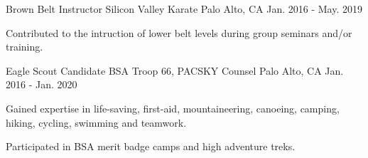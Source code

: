 

\begin{cventries}

  \cventry
    {Brown Belt Instructor} %
    {Silicon Valley Karate} %
    {Palo Alto, CA} %
    {Jan. 2016 - May. 2019} %
    {
      \begin{cvitems} %
        \item {Contributed to the intruction of lower belt levels during group
		seminars and/or training.}
      \end{cvitems}
    }

  \cventry
    {Eagle Scout Candidate} %
    {BSA Troop 66, PACSKY Counsel} %
    {Palo Alto, CA} %
    {Jan. 2016 - Jan. 2020} %
    {
      \begin{cvitems} %
        \item {Gained expertise in life-saving, first-aid, mountaineering,
		canoeing, camping, hiking, cycling, swimming and teamwork.}
        \item {Participated in BSA merit badge camps and high adventure treks.}
      \end{cvitems}
    }

\end{cventries}
